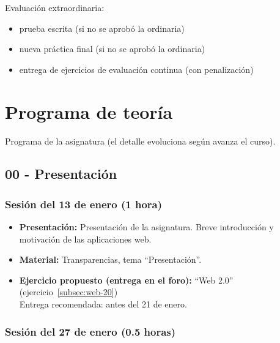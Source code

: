 \documentclass[a4paper,12pt]{article}
\begin{document}
Evaluación extraordinaria:

\begin{itemize}
\item prueba escrita (si no se aprobó la ordinaria)
\item nueva práctica final (si no se aprobó la ordinaria)
\item entrega de ejercicios de evaluación continua (con penalización)
\end{itemize}

\newpage

\section{Programa de teoría}

Programa de la asignatura (el detalle evoluciona según avanza el curso).

\subsection{00 - Presentación}

\subsubsection{Sesión del 13 de enero (1 hora)}

\begin{itemize}
\item \textbf{Presentación:} Presentación de la asignatura. Breve introducción y motivación de las aplicaciones web.
\item \textbf{Material:} Transparencias, tema ``Presentación''.
\item \textbf{Ejercicio propuesto (entrega en el foro):} ``Web 2.0'' (ejercicio~\ref{subsec:web-20}) \\
  Entrega recomendada: antes del 21 de enero.
\end{itemize}

\subsubsection{Sesión del 27 de enero (0.5 horas)}
\end{document}
